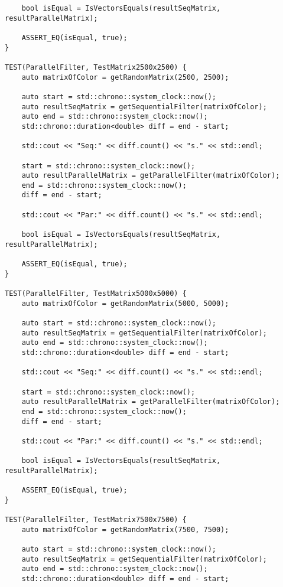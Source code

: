 \documentclass{report}
\begin{document}
\begin{lstlisting}
    bool isEqual = IsVectorsEquals(resultSeqMatrix, resultParallelMatrix);

    ASSERT_EQ(isEqual, true);
}

TEST(ParallelFilter, TestMatrix2500x2500) {
    auto matrixOfColor = getRandomMatrix(2500, 2500);

    auto start = std::chrono::system_clock::now();
    auto resultSeqMatrix = getSequentialFilter(matrixOfColor);
    auto end = std::chrono::system_clock::now();
    std::chrono::duration<double> diff = end - start;

    std::cout << "Seq:" << diff.count() << "s." << std::endl;

    start = std::chrono::system_clock::now();
    auto resultParallelMatrix = getParallelFilter(matrixOfColor);
    end = std::chrono::system_clock::now();
    diff = end - start;

    std::cout << "Par:" << diff.count() << "s." << std::endl;

    bool isEqual = IsVectorsEquals(resultSeqMatrix, resultParallelMatrix);

    ASSERT_EQ(isEqual, true);
}

TEST(ParallelFilter, TestMatrix5000x5000) {
    auto matrixOfColor = getRandomMatrix(5000, 5000);

    auto start = std::chrono::system_clock::now();
    auto resultSeqMatrix = getSequentialFilter(matrixOfColor);
    auto end = std::chrono::system_clock::now();
    std::chrono::duration<double> diff = end - start;

    std::cout << "Seq:" << diff.count() << "s." << std::endl;

    start = std::chrono::system_clock::now();
    auto resultParallelMatrix = getParallelFilter(matrixOfColor);
    end = std::chrono::system_clock::now();
    diff = end - start;

    std::cout << "Par:" << diff.count() << "s." << std::endl;

    bool isEqual = IsVectorsEquals(resultSeqMatrix, resultParallelMatrix);

    ASSERT_EQ(isEqual, true);
}

TEST(ParallelFilter, TestMatrix7500x7500) {
    auto matrixOfColor = getRandomMatrix(7500, 7500);

    auto start = std::chrono::system_clock::now();
    auto resultSeqMatrix = getSequentialFilter(matrixOfColor);
    auto end = std::chrono::system_clock::now();
    std::chrono::duration<double> diff = end - start;


\end{lstlisting}
\end{document}
